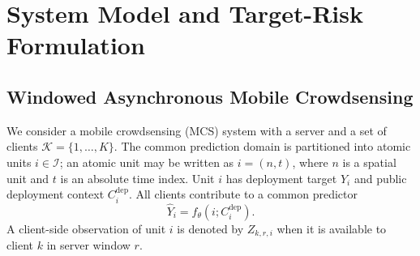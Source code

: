 \documentclass[letterpaper,journal]{IEEEtran}
\begin{document}


\section{System Model and Target-Risk Formulation}
\label{sec:system_model}

\subsection{Windowed Asynchronous Mobile Crowdsensing}
\label{subsec:windowed_mcs}

We consider a mobile crowdsensing (MCS) system with a server and a set of
clients $\mathcal{K}=\{1,\ldots,K\}$.  The common prediction domain is
partitioned into atomic units $i\in\mathcal{I}$; an atomic unit may be written as
$i=(n,t)$, where $n$ is a spatial unit and $t$ is an absolute time index.  Unit
$i$ has deployment target $Y_i$ and public deployment context
$C_i^{\mathrm{dep}}$.  All clients contribute to a common predictor
\begin{equation}
    \widehat Y_i=f_{\theta}(i;C_i^{\mathrm{dep}}).
    \label{eq:common_predictor}
\end{equation}
A client-side observation of unit $i$ is denoted by $Z_{k,r,i}$ when it is
available to client $k$ in server window $r$.
\end{document}
